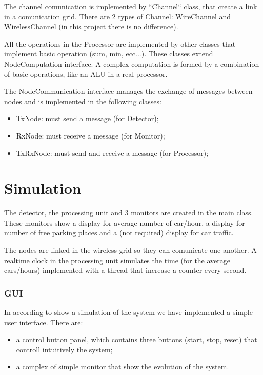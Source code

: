 \documentclass[a4paper,titlepage]{article}
\begin{document}
The channel comunication is implemented by ``Channel`` class, that create a link in a comunication grid. There are 2 types of Channel: WireChannel and WirelessChannel (in this project there is no difference).

All the operations in the Processor are implemented by other classes that implement basic operation (sum, min, ecc...). These classes extend NodeComputation interface. A complex computation is formed by a combination of basic operations, like an ALU in a real processor.

The NodeCommunication interface manages the exchange of messages between nodes and is implemented in the following classes:

\begin{itemize}[noitemsep,topsep=20pt,parsep=10pt,partopsep=20pt]

\item TxNode: must send a message (for Detector);

\item RxNode: must receive a message (for Monitor);

\item TxRxNode: must send and receive a message (for Processor);

\end{itemize}

\newpage
\part{Simulation}

The detector, the processing unit and 3 monitors are created in the main class. These monitors show a display for average number of car/hour, a display for number of free parking places and a (not required) display for car traffic.

The nodes are linked in the wireless grid so they can comunicate one another. A realtime clock in the processing unit simulates the time (for the average cars/hours) implemented with a thread that increase a counter every second.

\section*{GUI}

In according to show a simulation of the system we have implemented a simple user interface. There are:

\begin{itemize}

\item a control button panel, which contains three buttons (start, stop, reset) that controll intuitively the system;
\item a complex of simple monitor that show the evolution of the system.

\end{itemize}
\end{document}
